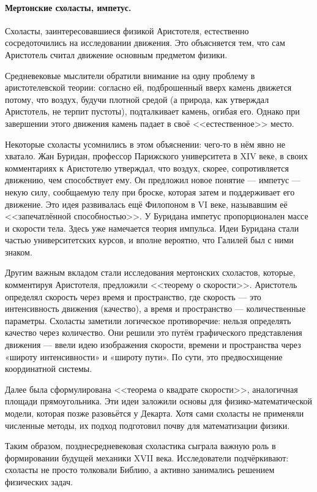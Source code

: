 \paragraph{Мертонские схоласты, импетус.}

Схоласты, заинтересовавшиеся физикой Аристотеля, естественно сосредоточились на исследовании движения. Это объясняется тем, что сам Аристотель считал движение основным предметом физики.

Средневековые мыслители обратили внимание на одну проблему в аристотелевской теории: согласно ей, подброшенный вверх камень движется потому, что воздух, будучи плотной средой (а природа, как утверждал Аристотель, не терпит пустоты), подталкивает камень, огибая его. Однако при завершении этого движения камень падает в своё <<естественное>> место.

Некоторые схоласты усомнились в этом объяснении: чего-то в нём явно не хватало. Жан Буридан, профессор Парижского университета в XIV веке, в своих комментариях к Аристотелю утверждал, что воздух, скорее, сопротивляется движению, чем способствует ему. Он предложил новое понятие --- импетус --- некую силу, сообщаемую телу при броске, которая затем и поддерживает его движение. Это идея развивалась ещё Филопоном в VI веке, называвшим её <<запечатлённой способностью>>. У Буридана импетус пропорционален массе и скорости тела. Здесь уже намечается теория импульса. Идеи Буридана стали частью университетских курсов, и вполне вероятно, что Галилей был с ними знаком.

Другим важным вкладом стали исследования мертонских схоластов, которые, комментируя Аристотеля, предложили <<теорему о скорости>>. Аристотель определял скорость через время и пространство, где скорость --- это интенсивность движения (качество), а время и пространство --- количественные параметры. Схоласты заметили логическое противоречие: нельзя определять качество через количество. Они решили это путём графического представления движения --- ввели идею изображения скорости, времени и пространства через «широту интенсивности» и «широту пути». По сути, это предвосхищение координатной системы.

Далее была сформулирована <<теорема о квадрате скорости>>, аналогичная площади прямоугольника. Эти идеи заложили основы для физико-математической модели, которая позже разовьётся у Декарта. Хотя сами схоласты не применяли численные методы, их подход подготовил почву для математизации физики.

Таким образом, позднесредневековая схоластика сыграла важную роль в формировании будущей механики XVII века. Исследователи подчёркивают: схоласты не просто толковали Библию, а активно занимались решением физических задач.


